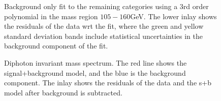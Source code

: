 \documentclass[10pt, aps, twocolumn, a4paper, nofootinbib]{revtex4}
\begin{document}
{\begin{figure}[H]
\centering
{}
\caption{Background only fit to the remaining categories using a 3rd order polynomial in the mass region $105-160$GeV. The lower inlay shows the residuals of the data wrt the fit, where the green and yellow standard deviation bands include statistical uncertainties in the background component of the fit. \label{fig:bkgonly_rest}}
\end{figure}

\begin{figure}[H]
\centering
{}
\caption{Diphoton invariant mass spectrum. The red line shows the signal+background model, and the blue is the background component. The inlay shows the residuals of the data and the s+b model after background is subtracted.\label{fig:bkgsub_rest}}
\end{figure}

\par}
\end{document}
